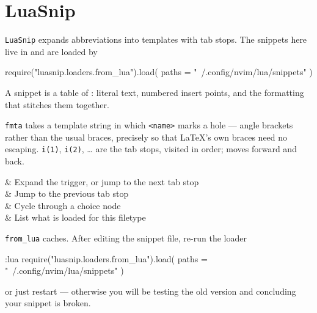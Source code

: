 \section{LuaSnip}\label{sec:setup-luasnip}

\texttt{LuaSnip} \cite{luasnip} expands abbreviations into templates with tab
stops. The
snippets here live in  and are loaded by

\begin{luacode}
require("luasnip.loaders.from_lua").load({ paths = "~/.config/nvim/lua/snippets" })
\end{luacode}

A snippet is a table of : literal text, numbered insert points, and
the formatting that stitches them together.


\texttt{fmta} takes a template string in which \texttt{<name>} marks a hole ---
angle brackets rather than the usual braces, precisely so that \LaTeX's own
braces need no escaping. \texttt{i(1)}, \texttt{i(2)}, \dots{} are the tab stops,
visited in order;  moves forward and  back.

\begin{keys}[0.30]
	       & Expand the trigger, or jump to the next tab stop \\
	     & Jump to the previous tab stop                    \\
	       & Cycle through a choice node                      \\
	 & List what is loaded for this filetype  \\
\end{keys}

\begin{note}
	\texttt{from\_lua} caches. After editing the snippet file, re-run the loader
\begin{vimcode}
:lua require("luasnip.loaders.from_lua").load({
  paths = "~/.config/nvim/lua/snippets" })
\end{vimcode}
	or just restart --- otherwise you will be testing the old version and
	concluding your snippet is broken.
\end{note}

